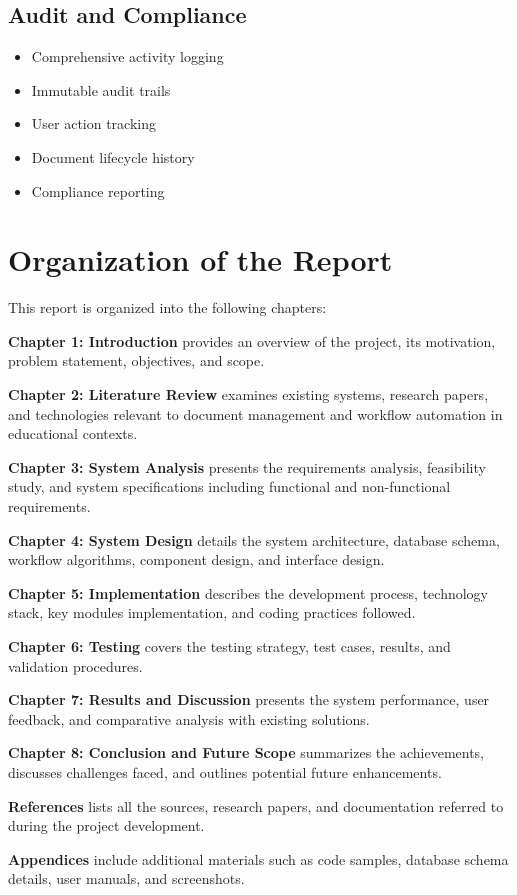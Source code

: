 \subsection{Audit and Compliance}
\begin{itemize}[itemsep=3pt]
\item Comprehensive activity logging
\item Immutable audit trails
\item User action tracking
\item Document lifecycle history
\item Compliance reporting
\end{itemize}

\section{Organization of the Report}

This report is organized into the following chapters:

\textbf{Chapter 1: Introduction} provides an overview of the project, its motivation, problem statement, objectives, and scope.

\textbf{Chapter 2: Literature Review} examines existing systems, research papers, and technologies relevant to document management and workflow automation in educational contexts.

\textbf{Chapter 3: System Analysis} presents the requirements analysis, feasibility study, and system specifications including functional and non-functional requirements.

\textbf{Chapter 4: System Design} details the system architecture, database schema, workflow algorithms, component design, and interface design.

\textbf{Chapter 5: Implementation} describes the development process, technology stack, key modules implementation, and coding practices followed.

\textbf{Chapter 6: Testing} covers the testing strategy, test cases, results, and validation procedures.

\textbf{Chapter 7: Results and Discussion} presents the system performance, user feedback, and comparative analysis with existing solutions.

\textbf{Chapter 8: Conclusion and Future Scope} summarizes the achievements, discusses challenges faced, and outlines potential future enhancements.

\textbf{References} lists all the sources, research papers, and documentation referred to during the project development.

\textbf{Appendices} include additional materials such as code samples, database schema details, user manuals, and screenshots.

\newpage
